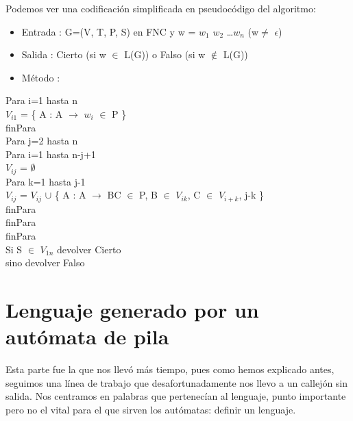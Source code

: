 \documentclass[12pt,a4paper,spanish]{book}
\begin{document}
Podemos ver una codificaci\'on simplificada en pseudoc\'odigo del algoritmo:\\
\begin{itemize}
\item \noindent Entrada : G=(V, T, P, S) en FNC y w = $w_{1}$ $w_{2}$ \ldots $w_{n}$ (w$\neq$ $\epsilon$)

\item \noindent Salida : Cierto (si w $\in$ L(G)) o Falso (si w $\notin$ L(G))

 \item \noindent M\'etodo :
\end{itemize}
{\ttfamily

\noindent Para i=1 hasta n\\

\indent $V_{i1}$ = \{ A : A $\rightarrow$ $w_{i}$ $\in$ P \}\\

finPara\\

Para j=2 hasta n\\

\indent Para i=1 hasta n-j+1\\

\indent \indent $V_{ij}$ = $\emptyset$\\

\indent \indent Para k=1 hasta j-1\\

\indent \indent \indent $V_{ij}$ = $V_{ij}$ $\cup$ \{ A : A $\rightarrow$ BC $\in$ P, B $\in$ $V_{ik}$, C $\in$ $V_{i+k}$, j-k \}\\

\indent \indent finPara\\

\indent finPara\\

finPara\\

Si S $\in$ $V_{1n}$ devolver Cierto\\

sino devolver Falso\\

}

\newpage

\section{Lenguaje generado por un aut\'omata de pila}
Esta parte fue la que nos llev\'o m\'as tiempo, pues como hemos explicado antes, seguimos una l\'inea de trabajo que desafortunadamente nos llevo a un callej\'on sin salida. Nos centramos en palabras que pertenec\'ian al lenguaje, punto importante pero no el vital para el que sirven los aut\'omatas: definir un lenguaje.
\end{document}
